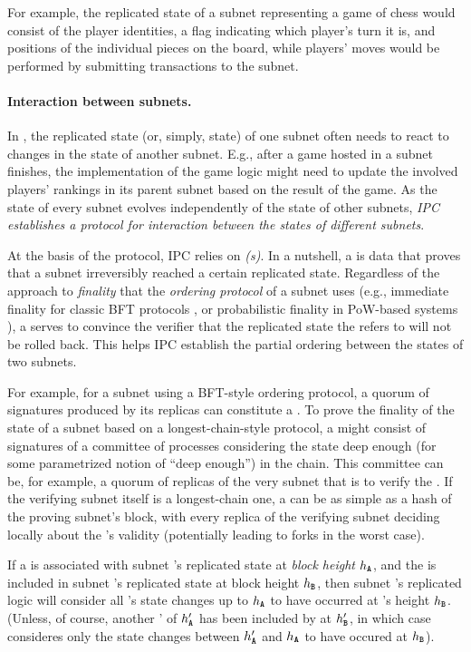 For example, the replicated state of a subnet representing a game of chess would consist of the player identities, a flag indicating which player's turn it is, and positions of the individual pieces on the board,
while players' moves would be performed by submitting transactions to the subnet.

\paragraph{Interaction between subnets.}
In \ipc, the replicated state (or, simply, state) of one subnet often needs to react to changes in the state of another subnet.
E.g., after a game hosted in a subnet finishes, the implementation of the game logic might need to update the involved players' rankings in its parent subnet based on the result of the game.
As the state of every subnet evolves independently of the state of other subnets,
\emph{IPC establishes a protocol for interaction between the states of different subnets}.

At the basis of the protocol, IPC relies on  \emph{\pofsFull ({\pof}s)}.
In a nutshell, a \pof is data that proves that a subnet irreversibly reached a certain replicated state.
Regardless of the approach to \emph{finality} that the  \emph{ordering protocol} of a subnet uses (e.g., immediate finality for classic BFT protocols \cite{}, or probabilistic finality in PoW-based systems \cite{Bitcoin}),
a \pof serves to convince the verifier that the replicated state the \pof refers to will not be rolled back. This helps IPC establish the partial ordering between the states of two subnets. 


For example, for a subnet using a BFT-style ordering protocol, a quorum of signatures produced by its replicas can constitute a \pof.
To prove the finality of the state of a subnet based on a longest-chain-style protocol,
a \pof might consist of signatures of a committee of processes considering the state deep enough (for some parametrized notion of ``deep enough'') in the chain.
This committee can be, for example, a quorum of replicas of the very subnet that is to verify the \pof.
If the verifying subnet itself is a longest-chain one, a \pof can be as simple as a hash of the proving subnet's block,
with every replica of the verifying subnet deciding locally about the \pof's validity (potentially leading to forks in the worst case).

If a \pof is associated with subnet 's replicated state at \emph{block height} $h_{\textbf{\texttt{A}}}$,
and the \pof is included in subnet 's replicated state at block height $h_{\textbf{\texttt{B}}}$,
then subnet 's replicated logic will consider all 's state changes up to $h_{\textbf{\texttt{A}}}$
to have occurred at 's height $h_{\textbf{\texttt{B}}}$.
(Unless, of course, another \pof' of $h'_{\textbf{\texttt{A}}}$ has been included by  at $h'_{\textbf{\texttt{B}}}$,
in which case  consideres only the state changes between $h'_{\textbf{\texttt{A}}}$ and $h_{\textbf{\texttt{A}}}$ to have occured at $h_{\textbf{\texttt{B}}}$).

